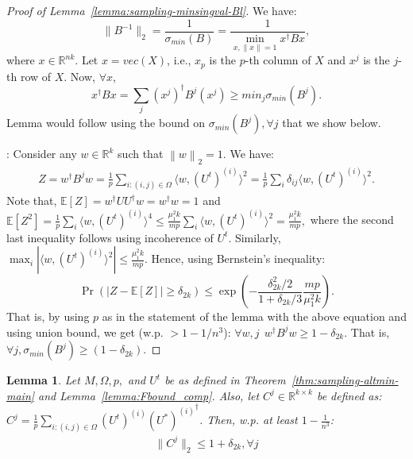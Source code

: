 \documentclass[11pt]{article}
\theoremstyle{plain}
\newtheorem{lemma}[theorem]{Lemma}
\theoremstyle{definition}
\newcommand{\R}{\mathbb{R}}
\newcommand{\twonorm}[1]{\left\| {#1} \right\|_2}
\newcommand{\E}{\mathbb{E}}
\newcommand{\Ut}{U^{t}}
\newcommand{\Uo}{U^*}
\newcommand{\ip}[2]{\langle #1, #2 \rangle}
\begin{document}
\begin{proof}[Proof of Lemma~\ref{lemma:sampling-minsingval-Bl}]
We have:
$$\|B^{-1}\|_2=\frac{1}{\sigma_{min}(B)}=\frac{1}{\min_{x, \|x\|=1}x^\dag B x},$$
where $x\in \mathbb{R}^{nk}$. Let $x=vec(X)$, i.e.,  $x_p$ is the $p$-th column of $X$ and $x^j$ is the $j$-th row of $X$. Now, $\forall x$,
$$x^\dag B x=\sum_{j} (x^j)^\dag B^j (x^j)\geq min_j \sigma_{min}(B^j).$$
Lemma would follow using the bound on $\sigma_{min}(B^j), \forall j$ that we show below. 

: Consider any $w\in \R^k$ such that $\twonorm{w}=1$.
We have:
\begin{align*}
  Z=w^\dag  B^j w = \frac{1}{p}\sum_{i:(i,j)\in \Omega} \ip{w}{(\Ut)^{(i)}}^2= \frac{1}{p}\sum_{i}\delta_{ij}\ip{w}{(\Ut)^{(i)}}^2.
\end{align*}
Note that, $\E[Z]=w^\dag UU^\dag w=w^\dag w=1$ and $\E[Z^2]=\frac{1}{p}\sum_{i}\ip{w}{(\Ut)^{(i)}}^4\leq \frac{\mu_1^2k}{mp}\sum_{i}\ip{w}{(\Ut)^{(i)}}^2=\frac{\mu_1^2k}{mp},$ where the second last inequality follows using incoherence of $\Ut$. Similarly, $\max_{i}|\ip{w}{(\Ut)^{(i)}}^2|\leq \frac{\mu_1^2k}{mp}$. Hence, using Bernstein's inequality: 
$$\Pr(|Z-\E[Z]|\geq \delta_{2k})\leq \exp(-\frac{\delta_{2k}^2/2}{1+\delta_{2k}/3}\frac{mp}{\mu_1^2k}).$$
That is, by using $p$ as in the statement of the lemma with the above equation and using union bound, we get (w.p. $>1-1/n^3$): $\forall w,j\ \ w^\dag B^j w \geq 1-\delta_{2k}$. That is, $\forall j, \sigma_{min}(B^j)\geq (1-\delta_{2k})$. 
\end{proof}
\begin{lemma}\label{lemma:sampling-minsingval-Cjl}
Let $M, \Omega, p,$ and $\Ut$ be as defined in Theorem~\ref{thm:sampling-altmin-main} and Lemma~\ref{lemma:Fbound_comp}. Also, let $C^j \in \mathbb{R}^{k\times k}$ be defined as: $C^j=\frac{1}{p}\sum_{i:(i,j)\in \Omega} (\Ut)^{(i)}{(\Uo)^{(i)}}^\dag$. Then, w.p. at least $1-\frac{1}{n^3}$: 
\begin{align}\label{eqn:sampling-minsingval-Cjl}
\|C^j\|_2\leq 1+\delta_{2k}, \forall j
\end{align}
\end{lemma}
\end{document}
